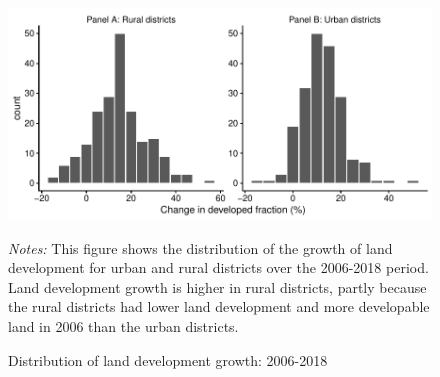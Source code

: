 \documentclass[
  12pt,
]{article}
\begin{document}
\begin{figure}[H]
\centering

\begin{center}\includegraphics{output/figs/developed-fraction-growth-1} \end{center}

\caption{Distribution of land development growth: 2006-2018}
\medskip
\begin{minipage}{0.9\textwidth}
\footnotesize
\textit{Notes:} This figure shows the distribution of the growth of land development for urban and rural districts over the 2006-2018 period. Land development growth is higher in rural districts, partly because the rural districts had lower land development and more developable land in 2006 than the urban districts.
\end{minipage}
\end{figure}
\end{document}
